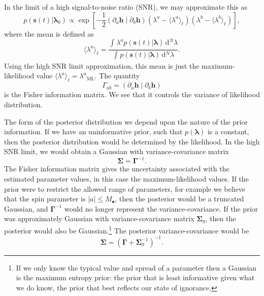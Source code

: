 \documentclass[a4paper, 11pt, titlepage, twoside]{report}
\newcommand{\sub}[1]{\ensuremath{_\mathrm{#1}}}
\newcommand{\recip}[1]{\ensuremath{\frac{1}{#1}}}
\newcommand{\innerprod}[2]{\ensuremath{\left({#1}\middle|{#2}\right)}}
\newcommand{\dd}{\ensuremath{\mathrm{d}}}
\newcommand{\intd}[4]{\ensuremath{\int_{#1}^{#2}{#3}\,\dd{#4}}}
\begin{document}
In the limit of a high signal-to-noise ratio (SNR), we may approximate this as\cite{Vallisneri2008}
\begin{equation}
p(\boldsymbol{s}(t)|\boldsymbol{\lambda}_0) \propto \exp\left[-\recip{2}\innerprod{\partial_a\boldsymbol{h}}{\partial_b\boldsymbol{h}}\left(\lambda^a - \langle\lambda^a\rangle_\ell\right)\left(\lambda^b - \langle\lambda^b\rangle_\ell\right)\right],
\end{equation}
where the mean is defined as
\begin{equation}
\langle\lambda^a\rangle_\ell = \frac{\intd{}{}{\lambda^a p(\boldsymbol{s}(t)|\boldsymbol{\lambda})}{^N \lambda}}{\intd{}{}{p(\boldsymbol{s}(t)|\boldsymbol{\lambda})}{^N \lambda}}.
\end{equation}
Using the high SNR limit approximation, this mean is just the maximum-likelihood value $\langle\lambda^a\rangle_\ell = \lambda^a\sub{ML}$. The quantity
\begin{equation}
\Gamma_{ab} = \innerprod{\partial_a\boldsymbol{h}}{\partial_b\boldsymbol{h}}
\end{equation}
is the Fisher information matrix. We see that it controls the variance of likelihood distribution.

The form of the posterior distribution we depend upon the nature of the prior information. If we have an uninformative prior, such that $p(\boldsymbol{\lambda})$ is a constant, then the posterior distribution would be determined by the likelihood. In the high SNR limit, we would obtain a Gaussian with variance-covariance matrix
\begin{equation}
\boldsymbol{\Sigma} = \boldsymbol{\Gamma}^{-1}.
\end{equation}
The Fisher information matrix gives the uncertainty associated with the estimated parameter values, in this case the maximum-likelihood values. If the prior were to restrict the allowed range of parameters, for example we believe that the spin parameter is $|a| \leq M_\bullet$, then the posterior would be a truncated Gaussian, and $\boldsymbol{\Gamma}^{-1}$ would no longer represent the variance-covariance. If the prior was approximately Gaussian with variance-covariance matrix $\boldsymbol{\Sigma}_0$, then the posterior would also be Gaussian.\footnote{If we only know the typical value and spread of a parameter then a Gaussian is the maximum entropy prior\cite{Jaynes2003}: the prior that is least informative given what we do know, the prior that best reflects our state of ignorance.} The posterior variance-covariance would be\cite{Cutler1994, Vallisneri2008}
\begin{equation}
\boldsymbol{\Sigma} = \left(\boldsymbol{\Gamma} + \boldsymbol{\Sigma}_0^{-1}\right)^{-1}.
\end{equation}
\end{document}
